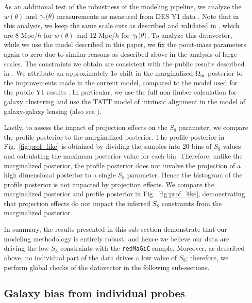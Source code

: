 \documentclass[aps, prd,twocolumn,superscriptaddress,nofootinbib,preprintnumbers]{revtex4-1}
\newcommand{\gammat}{\ensuremath{\gamma_{\rm t}(\theta)}}
\newcommand{\wtheta}{\ensuremath{w(\theta)}}
\newcommand{\redmagic}{\texttt{redMaGiC} }
\begin{document}
As an additional test of the robustness of the modeling pipeline, we analyze the $\wtheta$ and $\gammat$ measurements as measured from DES Y1 data \citep{Abbott_2018}. Note that in this analysis, we keep the same scale cuts as described and validated in \citet{Abbott_2018}, which are $8$ Mpc/$h$ for $\wtheta$ and $12$ Mpc/$h$ for $\gammat$. To analyze this datavector, while we use the model described in this paper, we fix the point-mass parameters again to zero due to similar reasons as described above in the analysis of large scales. The constraints we obtain are consistent with  the public results  described in \citet{Abbott_2018}. We attribute an approximately $1\sigma$ shift in the marginalized $\Omega_{\rm m}$ posterior to the improvements made in the current model, compared to the model used for the public Y1 results \citep{Krause2017}. In particular, we use the full non-limber calculation for galaxy clustering and use the TATT model of intrinsic alignment in the model of galaxy-galaxy lensing (also see \citet{Fang_nonlimber}). 

Lastly, to assess the impact of projection effects on the $S_8$ parameter, we compare the profile posterior to the marginalized posterior. The profile posterior in Fig.~\ref{fig:prof_like} is obtained by dividing the samples into 20 bins of $S_8$ values and calculating the maximum posterior value for each bin. Therefore, unlike the marginalized posterior, the profile posterior does not involve the projection of a high dimensional posterior to a single $S_8$ parameter. Hence the histogram of the profile posterior is not impacted by projection effects. We compare the marginalized posterior and profile posterior in Fig.~\ref{fig:prof_like}, demonstrating that projection effects do not impact the inferred $S_8$ constraints from the marginalized posterior.  
 
In summary,  the results presented in this sub-section demonstrate that our modeling methodology is entirely robust, and hence we believe our data are driving the low $S_8$ constraints with the \redmagic  sample. Moreover, as described above, no individual part of the data drives a low value of $S_8$; therefore, we perform global checks of the datavector in the following sub-sections.

\subsection{Galaxy bias from individual probes}
\end{document}
